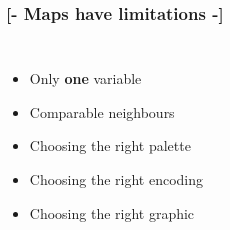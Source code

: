 \documentclass[xcolor=x11names,compress]{beamer}
\renewcommand{\(}{\begin{columns}}
\renewcommand{\)}{\end{columns}}
\newcommand{\<}[1]{\begin{column}{#1}}
\renewcommand{\>}{\end{column}}
\begin{document}
\begin{frame}
\frametitle{\textcolor{brique}{[-  \textbf{Maps have limitations} -]}}
    \begin{columns}
            \begin{itemize}[<+->]
                \item Only \textbf{one} variable 
                \item Comparable neighbours
                \item Choosing the right palette 
                \item Choosing the right encoding
                \item Choosing the right graphic
            \end{itemize}

\end{columns}
\end{frame}
\end{document}

